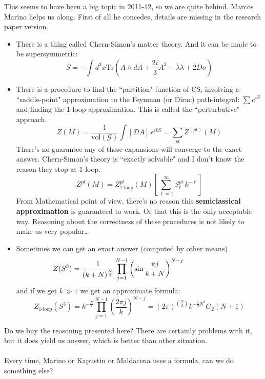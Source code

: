 \documentclass[12pt]{article}
\begin{document}
\noindent This seems to have been a big topic in 2011-12, so we are quite behind.  Marcos Marino helps us along.  First of all he concedes, details are missing in the research paper version.
\begin{itemize}
\item There is a thing called Chern-Simon's matter theory.  And it can be made to be supersymmetric:
$$S = - \int d^3 x \mathrm{Tr} \left( A \wedge dA + \frac{2i}{3}A^3  - \overline{\lambda}{\lambda} + 2 D \sigma \right)  $$
\item There is a procedure to find the ``partition" function of CS, involving a ``saddle-point" approximation to the Feynman (or Dirac) path-integral: $\sum e^{iS}$ and finding the 1-loop approximation.  This is called the ``perturbative" approach. 
$$ Z (M) = \frac{1}{\text{vol}(\mathcal{G})} \int [\mathcal{D}A] \,e^{ikS} = \sum_{pt} Z^{(pt)}(M)$$
There's no guarantee any of these expansions will converge to the exact answer.  Chern-Simon's theory is ``exactly solvable" and I don't know the reason they stop at 1-loop.
$$ Z^{pt}(M) = Z_{\text{1-loop}}^{pt}(M) \left[  \sum_{\ell = 1}^\infty S_\ell^{pt} \, k^{-\ell} \right]  $$
From Mathematical point of view, there's no reason this \textbf{semiclassical approximation} is guaranteed to work.  Or that this is the only acceptable way.  Reasoning about the correctness of these procedures is not likely to make us very popular\dots
\item Sometimes we can get an exact answer (computed by other means)
$$ Z(S^3) = \frac{1}{ (k+N)^{\frac{N}{2}}} \prod_{j=1}^{N-1} \left( \sin \frac{\pi j}{k+N} \right)^{N-j} \hspace{0.8in} $$
and if we get $k \gg 1$ we get an approximate formula:
$$  Z_{\text{1-loop}}(S^3) = k^{- \frac{N}{2}} \prod_{j=1}^{N-1} \left( \frac{2\pi j}{k} \right)^{N-j}
= (2\pi)^{\binom{N}{2}} k^{ - \frac{1}{2}N^2} G_2(N+1) $$
\end{itemize} 
Do we buy the reasoning presented here?  There are certainly problems with it, but it does yield us answer, which is better than other situation. \\ \\
Every time, Marino or Kapustin or Maldacena uses a formula, can we do something else?

\vfill
\end{document}
